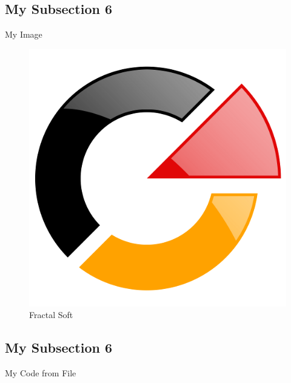 \documentclass[12pt]{beamer}
\begin{document}
\subsection{My Subsection 6}
\begin{frame}
  \begin{block}{My Image}
    \begin{figure}
      \centering
      \includegraphics{images/fractalsoft-logotype.png}
      \caption{Fractal Soft}
    \end{figure}
  \end{block}
\end{frame}

\subsection{My Subsection 6}
\begin{frame}
  \begin{block}{My Code from File}
    
  \end{block}
\end{frame}
\end{document}
